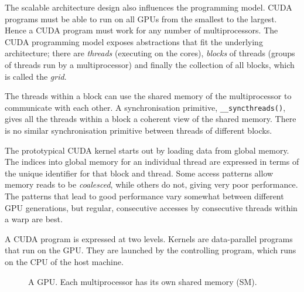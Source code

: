 The scalable architecture design also influences the programming model. CUDA 
programs must be able to run on all GPUs from the smallest to the largest.
Hence a CUDA program must work for any number of  multiprocessors.
The CUDA programming model exposes abstractions that fit the underlying 
architecture; there are {\em threads} (executing on the cores), {\em blocks} 
of threads (groups of threads run by a multiprocessor) and finally 
the collection of all blocks, which is called the {\em grid}.

The threads within a block can use the shared memory of the multiprocessor 
to communicate with each other. A synchronisation primitive, {\tt \_\_syncthreads()}, gives all the threads within a block a coherent view
of the shared memory. There is no similar 
synchronisation primitive between threads of different blocks.

The prototypical CUDA kernel starts out by loading data from global memory.
The indices into global memory for an individual thread are expressed
in terms of the unique identifier for that block and thread.
Some access patterns allow memory reads to be \emph{coalesced}, while others do not, giving very poor performance. The patterns that lead to good performance vary somewhat
between different GPU generations, but regular, consecutive accesses by consecutive threads within a warp are best.

 
A CUDA program is expressed at two levels. Kernels are data-parallel programs that run on the GPU. They are launched by the controlling 
program, which runs on the CPU of the host machine. 


\begin{figure} 
\def\s{.50}
\caption{ A GPU. Each multiprocessor has its own shared memory (SM). } 
\label{fig:GPU}
\end{figure}

